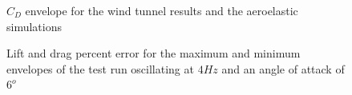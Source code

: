 \documentclass[11pt]{ucthesis}
\begin{document}
\begin{figure}[thpb]
\hfill
{}
\hfill
{}
\hfill
\caption{$C_D$ envelope for the wind tunnel results and the aeroelastic simulations}
\label{fig:CDEnvelope}
\end{figure}

\begin{figure}[thpb]
\hfill
{}
\hfill
{}
\hfill
\caption{Lift and drag percent error for the maximum and minimum envelopes of the test run oscillating at $4 Hz$ and an angle of attack of $6^o$}
\label{fig:PError5454}
\end{figure}
\end{document}
